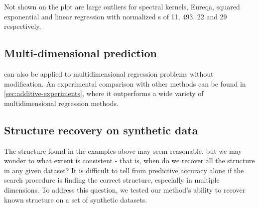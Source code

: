 Not shown on the plot are large outliers for spectral kernels, Eureqa, squared exponential and linear regression with normalized \RMSE{}s of 11, 493, 22 and 29 respectively.







\subsection{Multi-dimensional prediction}

\procedurename{} can also be applied to multidimensional regression problems without modification.
An experimental comparison with other methods can be found in \cref{sec:additive-experiments}, where it outperforms a wide variety of multidimensional regression methods.



\subsection{Structure recovery on synthetic data}
\label{sec:synthetic}

The structure found in the examples above may seem reasonable, but we may wonder to what extent \procedurename{} is consistent - that is, when do we recover all the structure in any given dataset?
It is difficult to tell from predictive accuracy alone if the search procedure is finding the correct structure, especially in multiple dimensions.
To address this question, we tested our method's ability to recover known structure on a set of synthetic datasets.

